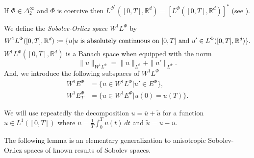 \documentclass[twoside]{article}
\theoremstyle{remark}
\newcommand{\orlnor}{\|_{L^{\Phi}}}
\newcommand{\lphi}{L^{\Phi}}
\newcommand{\lpsi}{L^{\Phi^*}}
\newcommand{\ephi}{E^{\Phi}}
\newcommand{\wphi}{W^{1}\lphi}
\newcommand{\wphie}{W^{1}\ephi}
\newcommand{\rr}{\mathbb{R}}
\renewcommand{\leq}{\leqslant}
\newcounter{example}
\begin{document}
 If $\Phi \in \Delta_2^{\infty}$ and $\Phi$ is coercive then $\lpsi([0,T],\rr^d)= \left[\lphi([0,T],\rr^d)\right]^*$  (see \cite[Thm. 2.9 , Thm. 2.10]{Desch2001}).





We define the \emph{Sobolev-Orlicz space} $\wphi$ by
\[\wphi([0,T],\rr^d):=\{u| u \hbox{ is absolutely continuous on $[0,T]$ and } u'\in \lphi([0,T],\rr^d)\}.\]
$\wphi([0,T],\rr^d)$ is a Banach space when equipped with the norm
\begin{equation}\label{def-norma-orlicz-sob}
\|  u  \|_{\wphi}= \|  u  \|_{\lphi} + \|u'\orlnor.
\end{equation}
And, we introduce the following subspaces of $\wphi$
\begin{equation}\label{def-esp-orlicz-sob-per}
\begin{split}
\wphie&=\{u\in\wphi|u'\in\ephi\},\\
\wphie_T&=\{u\in\wphie|u(0)=u(T)\}.
\end{split}
\end{equation}

%
%
 We will use repeatedly the decomposition $u=\overline{u}+\widetilde{u}$ for a function $u\in L^1([0,T])$  where $\overline{u} =\frac1T\int_0^T u(t)\ dt$ and $\widetilde{u}=u-\overline{u}$.

 The following lemma is an elementary generalization to anisotropic Sobolev-Orlicz spaces of known results of Sobolev spaces.


%
%
%
%
%
%
%
%
%
%
\end{document}

